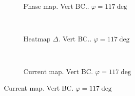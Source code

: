 \documentclass[../main.tex]{subfiles}
\begin{document}
\begin{figure}[H]
\begin{subfigure}{0.4\textwidth}
    \centering
    \hspace{-4cm} %
    
    \caption{Phase map. Vert BC.. $\varphi = 117\deg$}
    \label{fig:first}
\end{subfigure}    \\
\begin{subfigure}{0.4\textwidth}
    \centering
    \hspace{-4cm} %
    
    \caption{Heatmap $\Delta$. Vert BC.. $\varphi = 117\deg$}
    \label{fig:first}
\end{subfigure}    \\
\hspace{0.1\textwidth}
\begin{subfigure}{0.4\textwidth}
    \centering
    
    \caption{Current map. Vert BC. $\varphi = 117 \deg$}
    \label{fig:first}
\end{subfigure}
\end{figure}
\end{document}
